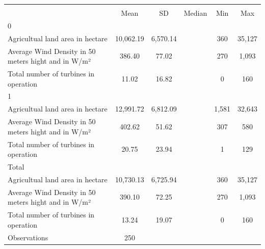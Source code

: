 {
\def\sym#1{\ifmmode^{#1}\else\(^{#1}\)\fi}
\begin{tabular}{l*{1}{ccccc}}
\toprule
                &\multicolumn{5}{c}{}                             \\
                &\multicolumn{1}{c}{{Mean}}&\multicolumn{1}{c}{{SD}}&\multicolumn{1}{c}{{Median}}&\multicolumn{1}{c}{{Min}}&\multicolumn{1}{c}{{Max}}\\
\midrule
0               &         &         &         &         &         \\
Agricultual land area in hectare&10,062.19& 6,570.14&         &      360&   35,127\\
Average Wind Density in 50 meters hight and in W/m²&   386.40&    77.02&         &      270&    1,093\\
Total number of turbines in operation&    11.02&    16.82&         &        0&      160\\
\midrule
1               &         &         &         &         &         \\
Agricultual land area in hectare&12,991.72& 6,812.09&         &    1,581&   32,643\\
Average Wind Density in 50 meters hight and in W/m²&   402.62&    51.62&         &      307&      580\\
Total number of turbines in operation&    20.75&    23.94&         &        1&      129\\
\midrule
Total           &         &         &         &         &         \\
Agricultual land area in hectare&10,730.13& 6,725.94&         &      360&   35,127\\
Average Wind Density in 50 meters hight and in W/m²&   390.10&    72.25&         &      270&    1,093\\
Total number of turbines in operation&    13.24&    19.07&         &        0&      160\\
\midrule
Observations    &      250&         &         &         &         \\
\bottomrule
\end{tabular}
}
